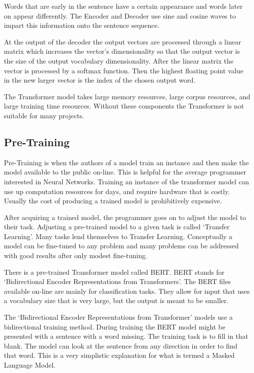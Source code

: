 Words that are early in the sentence have a certain appearance and words later on appear differently. The Encoder and Decoder use sine and cosine waves to impart this information onto the sentence sequence. 

At the output of the decoder the output vectors are processed through a linear matrix which increases the vector's dimensionality so that the output vector is the size of the output vocabulary dimensionality. After the linear matrix the vector is processed by a softmax function. Then the highest floating point value in the new larger vector is the index of the chosen output word.

The Transformer model takes large memory resources, large corpus resources, and large training time resources. Without these components the Transformer is not suitable for many projects.

\subsection*{Pre-Training}
Pre-Training is when the authors of a model train an instance and then make the model available to the public on-line. This is helpful for the average programmer interested in Neural Networks. Training an instance of the transformer model can use up computation resources for days, and require hardware that is costly. Usually the cost of producing a trained model is prohibitively expensive.

After acquiring a trained model, the programmer goes on to adjust the model to their task. Adjusting a pre-trained model to a given task is called `Transfer Learning'. Many tasks lend themselves to Transfer Learning. Conceptually a model can be fine-tuned to any problem and many problems can be addressed with good results after only modest fine-tuning.

There is a pre-trained Transformer model called \ac{BERT}. BERT stands for `Bidirectional Encoder Representations from Transformers'. The BERT files available on-line are mainly for classification tasks. They allow for input that uses a vocabulary size that is very large, but the output is meant to be smaller.

The `Bidirectional Encoder Representations from Transformer' models use a bidirectional training method. During training the BERT model might be presented with a sentence with a word missing. The training task is to fill in that blank. The model can look at the sentence from any direction in order to find that word. This is a very simplistic explanation for what is termed a Masked Language Model.

